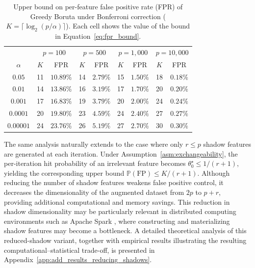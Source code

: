 \documentclass[runningheads]{llncs}
\begin{document}
\begin{table}[t]
\caption{Upper bound on per-feature false positive rate (FPR) of Greedy Boruta under Bonferroni correction ($K = \lceil \log_2(p/\alpha) \rceil$). Each cell shows the value of the bound in Equation~\eqref{eq:fpr_bound}.}
\label{tab:fpr}
\centering
\begin{tabular}{c|cc|cc|cc|cc}
\toprule
& \multicolumn{2}{c|}{$p = 100$}
& \multicolumn{2}{c|}{$p = 500$}
& \multicolumn{2}{c|}{$p = 1{,}000$}
& \multicolumn{2}{c}{$p = 10{,}000$} \\
$\alpha$
& $K$ & FPR
& $K$ & FPR
& $K$ & FPR
& $K$ & FPR \\
\midrule
$0.05$    
& 11 & $10.89\%$
& 14 & $2.79\%$
& 15 & $1.50\%$
& 18 & $0.18\%$ \\

$0.01$    
& 14 & $13.86\%$
& 16 & $3.19\%$
& 17 & $1.70\%$
& 20 & $0.20\%$ \\

$0.001$   
& 17 & $16.83\%$
& 19 & $3.79\%$
& 20 & $2.00\%$
& 24 & $0.24\%$ \\

$0.0001$  
& 20 & $19.80\%$
& 23 & $4.59\%$
& 24 & $2.40\%$
& 27 & $0.27\%$ \\

$0.00001$ 
& 24 & $23.76\%$
& 26 & $5.19\%$
& 27 & $2.70\%$
& 30 & $0.30\%$ \\
\bottomrule
\end{tabular}
\end{table}

The same analysis naturally extends to the case where only $r \leq p$ shadow features are generated at each iteration. Under Assumption~\ref{asm:exchangeability}, the per-iteration hit probability of an irrelevant feature becomes $\theta_0^\star \leq 1/(r+1)$, yielding the corresponding upper bound $\mathbb{P}(\mathrm{FP}) \leq K/(r+1)$. Although reducing the number of shadow features weakens false positive control, it decreases the dimensionality of the augmented dataset from $2p$ to $p+r$, providing additional computational and memory savings. This reduction in shadow dimensionality may be particularly relevant in distributed computing environments such as Apache Spark \cite{zaharia2016spark}, where constructing and materializing shadow features may become a bottleneck. A detailed theoretical analysis of this reduced-shadow variant, together with empirical results illustrating the resulting computational--statistical trade-off, is presented in Appendix~\ref{app:add_results_reducing_shadows}.
\end{document}
